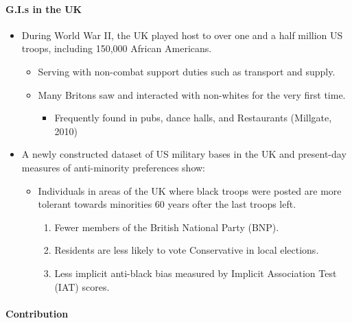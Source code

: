 \documentclass[../root]{subfiles}
\begin{document}
    \paragraph{G.I.s in the UK}

    \begin{itemize}
      \item During World War II, the UK played host to over one and a half million US troops, including 150,000 African Americans.
      \begin{itemize}
        \item Serving with non-combat support duties such as transport and supply.
        \item Many Britons saw and interacted with non-whites for the very first time.
        \begin{itemize}
          \item Frequently found in pubs, dance halls, and Restaurants (Millgate, 2010)
        \end{itemize}
      \end{itemize}
      \item A newly constructed dataset of US military bases in the UK and present-day measures of anti-minority preferences show:
      \begin{itemize}
        \item Individuals in areas of the UK where black troops were posted are more tolerant towards minorities 60 years ofter the last troops left.
        \begin{enumerate}
          \item Fewer members of the British National Party (BNP).
          \item Residents are less likely to vote Conservative in local elections.
          \item Less implicit anti-black bias measured by Implicit Association Test (IAT) scores.
        \end{enumerate}
      \end{itemize}
    \end{itemize}

    \paragraph{Contribution}
\end{document}
